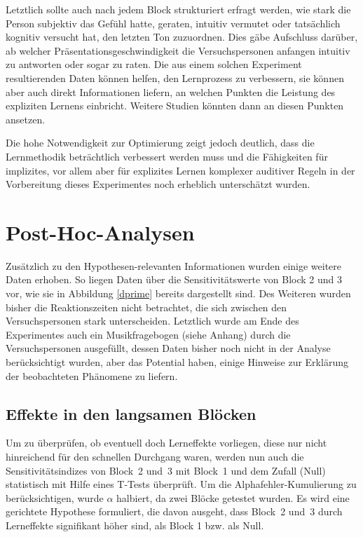 \documentclass[doc,a4paper,12pt]{apa6}
\begin{document}
Letztlich sollte auch nach jedem Block strukturiert erfragt werden, wie stark die Person subjektiv das Gefühl hatte, geraten, intuitiv vermutet oder tatsächlich kognitiv versucht hat, den letzten Ton zuzuordnen. Dies gäbe Aufschluss darüber, ab welcher Präsentationsgeschwindigkeit die Versuchspersonen anfangen intuitiv zu antworten oder sogar zu raten. Die aus einem solchen Experiment resultierenden Daten können helfen, den Lernprozess zu verbessern, sie können aber auch direkt Informationen liefern, an welchen Punkten die Leistung des expliziten Lernens einbricht. Weitere Studien könnten dann an diesen Punkten ansetzen.

Die hohe Notwendigkeit zur Optimierung zeigt jedoch deutlich, dass die Lernmethodik beträchtlich verbessert werden muss und die Fähigkeiten für implizites, vor allem aber für explizites Lernen komplexer auditiver Regeln in der Vorbereitung dieses Experimentes noch erheblich unterschätzt wurden.

\section{Post-Hoc-Analysen}

Zusätzlich zu den Hypothesen-relevanten Informationen wurden einige weitere Daten erhoben. So liegen Daten über die Sensitivitätswerte von Block 2 und 3 vor, wie sie in Abbildung \ref{dprime} bereits dargestellt sind. Des Weiteren wurden bisher die Reaktionszeiten nicht betrachtet, die sich zwischen den Versuchspersonen stark unterscheiden. Letztlich wurde am Ende des Experimentes auch ein Musikfragebogen (siehe Anhang) durch die Versuchspersonen ausgefüllt, dessen Daten bisher noch nicht in der Analyse berücksichtigt wurden, aber das Potential haben, einige Hinweise zur Erklärung der beobachteten Phänomene zu liefern.

\subsection{Effekte in den langsamen Blöcken}

Um zu überprüfen, ob eventuell doch Lerneffekte vorliegen, diese nur nicht hinreichend für den schnellen Durchgang waren, werden nun auch die Sensitivitätsindizes von Block~2 und~3 mit Block~1 und dem Zufall (Null) statistisch mit Hilfe eines T-Tests überprüft. Um die Alphafehler-Kumulierung zu berücksichtigen, wurde $\alpha$ halbiert, da zwei Blöcke getestet wurden. Es wird eine gerichtete Hypothese formuliert, die davon ausgeht, dass Block~2 und~3 durch Lerneffekte signifikant höher sind, als Block 1 bzw. als Null.
\end{document}
